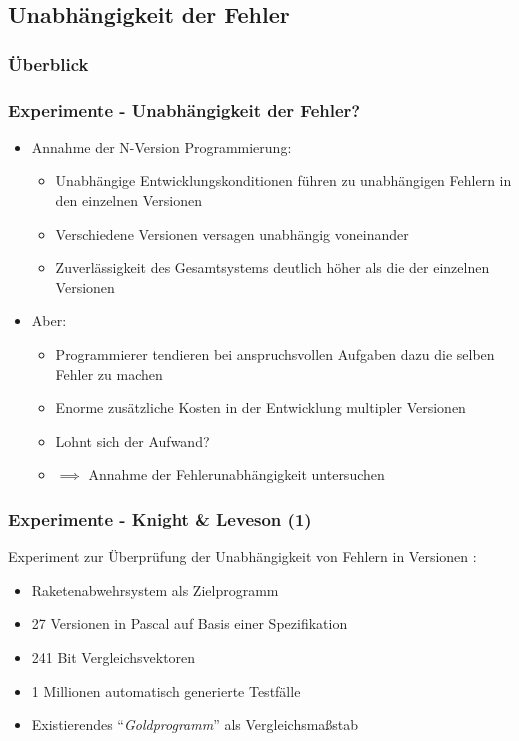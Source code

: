 \subsection{Unabhängigkeit der Fehler}
%
\begin{frame}
	\frametitle{Überblick}
	\tableofcontents[currentsubsection]
\end{frame}
%
\begin{frame}
	\frametitle{Experimente - Unabhängigkeit der Fehler?}
	\begin{itemize}
		\item Annahme der N-Version Programmierung:
			\begin{itemize}
				\item Unabhängige Entwicklungskonditionen führen zu unabhängigen Fehlern in den einzelnen Versionen
				\item Verschiedene Versionen versagen unabhängig voneinander
				\item Zuverlässigkeit des Gesamtsystems deutlich höher als die der einzelnen Versionen
			\end{itemize}
			\pause
			\item Aber:
			\begin{itemize}
				\item Programmierer tendieren bei anspruchsvollen Aufgaben dazu die selben Fehler zu machen
				\item Enorme zusätzliche Kosten in der Entwicklung multipler Versionen
				\item Lohnt sich der Aufwand?
				\item $\implies$ Annahme der Fehlerunabhängigkeit untersuchen
			\end{itemize}
		
	\end{itemize}
	
\end{frame}
%
%
\begin{frame}
	\frametitle{Experimente - Knight \& Leveson (1)}

	 Experiment zur Überprüfung der Unabhängigkeit von Fehlern in Versionen \cite{Knight:1986:EEA:10677.10688}:
		\begin{itemize}
			\item Raketenabwehrsystem als Zielprogramm
			\item 27 Versionen in Pascal auf Basis einer Spezifikation
			\item 241 Bit Vergleichsvektoren
			\item 1 Millionen automatisch generierte Testfälle
			\item Existierendes \enquote{\emph{Goldprogramm}} als Vergleichsmaßstab
		\end{itemize}

\end{frame}
